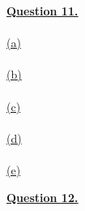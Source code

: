 \documentclass[12pt]{article}
\begin{document}
\hyperlink{toc}{\LARGE \underline{\textbf{Question 11.}}}\\
~\\\hyperlink{toc}{\hypertarget{11.1}{(a)}}\\

~\\\hyperlink{toc}{\hypertarget{11.2}{(b)}}\\

~\\\hyperlink{toc}{\hypertarget{11.3}{(c)}}\\

~\\\hyperlink{toc}{\hypertarget{11.4}{(d)}}\\

~\\\hyperlink{toc}{\hypertarget{11.5}{(e)}}\\
\newpage

\hyperlink{toc}{\hypertarget{12}{\LARGE \underline{\textbf{Question 12.}}}}\\
\end{document}
